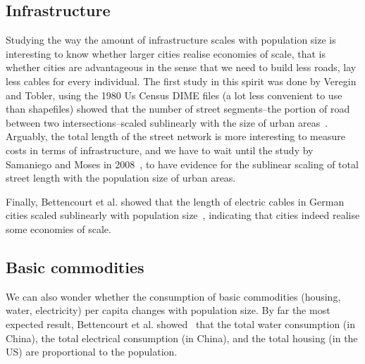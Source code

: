 \subsection{Infrastructure}
\label{sub:infrastructure}

Studying the way the amount of infrastructure scales with population size is
interesting to know whether larger cities realise economies of scale, that is
whether cities are advantageous in the sense that we need to build less
roads, lay less cables for every individual.
The first study in this spirit was done by Veregin and Tobler, using the 1980 Us
Census DIME files (a lot less convenient to use than shapefiles) showed that the
number of street segments--the portion of road between two intersections--scaled
sublinearly with the size of urban areas~\cite{Veregin:1997}. Arguably, the
total length of the street network is more interesting to measure costs in terms
of infrastructure, and we have to wait until the study by Samaniego and Moses in
2008~\cite{Samaniego:2008}, to have evidence for the sublinear scaling of total
street length with the population size of urban areas. 

Finally, Bettencourt et al. showed that the length of electric cables in German cities
scaled sublinearly with population size~\cite{Bettencourt:2007}, indicating that
cities indeed realise some economies of scale.

\subsection{Basic commodities}
\label{sub:basic_commodities}

We can also wonder whether the consumption of basic commodities (housing, water,
electricity) per capita changes with population size. By far the most expected
result, Bettencourt et al. showed~\cite{Bettencourt:2007} that the total water
consumption (in China), the total electrical
consumption (in China),  and the total housing (in the US) are proportional to
the population.\\


